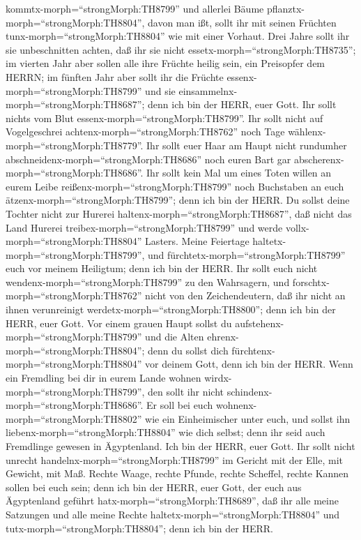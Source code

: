 kommtx-morph=``strongMorph:TH8799'' und allerlei Bäume
pflanztx-morph=``strongMorph:TH8804'', davon man ißt, sollt ihr mit
seinen Früchten tunx-morph=``strongMorph:TH8804'' wie mit einer Vorhaut.
Drei Jahre sollt ihr sie unbeschnitten achten, daß ihr sie nicht
essetx-morph=``strongMorph:TH8735'';  im vierten Jahr aber
sollen alle ihre Früchte heilig sein, ein Preisopfer dem HERRN;
 im fünften Jahr aber sollt ihr die Früchte
essenx-morph=``strongMorph:TH8799'' und sie
einsammelnx-morph=``strongMorph:TH8687''; denn ich bin der HERR, euer
Gott.  Ihr sollt nichts vom Blut
essenx-morph=``strongMorph:TH8799''. Ihr sollt nicht auf Vogelgeschrei
achtenx-morph=``strongMorph:TH8762'' noch Tage
wählenx-morph=``strongMorph:TH8779''.  Ihr sollt euer Haar
am Haupt nicht rundumher abschneidenx-morph=``strongMorph:TH8686'' noch
euren Bart gar abscherenx-morph=``strongMorph:TH8686''. 
Ihr sollt kein Mal um eines Toten willen an eurem Leibe
reißenx-morph=``strongMorph:TH8799'' noch Buchstaben an euch
ätzenx-morph=``strongMorph:TH8799''; denn ich bin der HERR.
 Du sollst deine Tochter nicht zur Hurerei
haltenx-morph=``strongMorph:TH8687'', daß nicht das Land Hurerei
treibex-morph=``strongMorph:TH8799'' und werde
vollx-morph=``strongMorph:TH8804'' Lasters.  Meine
Feiertage haltetx-morph=``strongMorph:TH8799'', und
fürchtetx-morph=``strongMorph:TH8799'' euch vor meinem Heiligtum; denn
ich bin der HERR.  Ihr sollt euch nicht
wendenx-morph=``strongMorph:TH8799'' zu den Wahrsagern, und
forschtx-morph=``strongMorph:TH8762'' nicht von den Zeichendeutern, daß
ihr nicht an ihnen verunreinigt werdetx-morph=``strongMorph:TH8800'';
denn ich bin der HERR, euer Gott.  Vor einem grauen Haupt
sollst du aufstehenx-morph=``strongMorph:TH8799'' und die Alten
ehrenx-morph=``strongMorph:TH8804''; denn du sollst dich
fürchtenx-morph=``strongMorph:TH8804'' vor deinem Gott, denn ich bin der
HERR.  Wenn ein Fremdling bei dir in eurem Lande wohnen
wirdx-morph=``strongMorph:TH8799'', den sollt ihr nicht
schindenx-morph=``strongMorph:TH8686''.  Er soll bei euch
wohnenx-morph=``strongMorph:TH8802'' wie ein Einheimischer unter euch,
und sollst ihn liebenx-morph=``strongMorph:TH8804'' wie dich selbst;
denn ihr seid auch Fremdlinge gewesen in Ägyptenland. Ich bin der HERR,
euer Gott.  Ihr sollt nicht unrecht
handelnx-morph=``strongMorph:TH8799'' im Gericht mit der Elle, mit
Gewicht, mit Maß.  Rechte Waage, rechte Pfunde, rechte
Scheffel, rechte Kannen sollen bei euch sein; denn ich bin der HERR,
euer Gott, der euch aus Ägyptenland geführt
hatx-morph=``strongMorph:TH8689'',  daß ihr alle meine
Satzungen und alle meine Rechte haltetx-morph=``strongMorph:TH8804'' und
tutx-morph=``strongMorph:TH8804''; denn ich bin der HERR.

